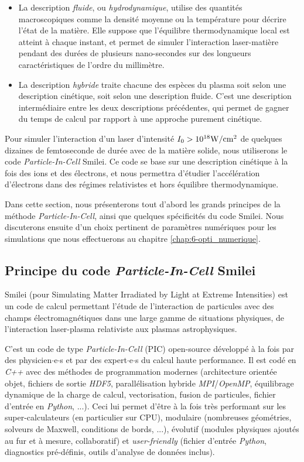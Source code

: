 \begin{refsection}
\begin{itemize}
    \item La description \textit{fluide}, ou \textit{hydrodynamique}, utilise des quantités macroscopiques comme la densité moyenne ou la température pour décrire l'état de la matière. Elle suppose que l'équilibre thermodynamique local est atteint à chaque instant, et permet de simuler l'interaction laser-matière pendant des durées de plusieurs nano-secondes sur des longueurs caractéristiques de l'ordre du millimètre.
    
    \item La description \textit{hybride} traite chacune des espèces du plasma soit selon une description cinétique, soit selon une description fluide. C'est une description intermédiaire entre les deux descriptions précédentes, qui permet de gagner du temps de calcul par rapport à une approche purement cinétique.
\end{itemize}

Pour simuler l'interaction d'un laser d'intensité $I_0>10^{18} \rm W/cm^2$ de quelques dizaines de femtoseconde de durée avec de la matière solide, nous utiliserons le code \textit{Particle-In-Cell} Smilei. Ce code se base sur une description cinétique à la fois des ions et des électrons, et nous permettra d'étudier l'accélération d'électrons dans des régimes relativistes et hors équilibre thermodynamique.

Dans cette section, nous présenterons tout d'abord les grands principes de la méthode \textit{Particle-In-Cell}, ainsi que quelques spécificités du code Smilei. Nous discuterons ensuite d'un choix pertinent de paramètres numériques pour les simulations que nous effectuerons au chapitre \ref{chap:6-opti_numerique}.

\subsection{Principe du code \textit{Particle-In-Cell} Smilei}

Smilei (pour Simulating Matter Irradiated by Light at Extreme Intensities) est un code de calcul permettant l'étude de l'interaction de particules avec des champs électromagnétiques dans une large gamme de situations physiques, de l’interaction laser-plasma relativiste aux plasmas astrophysiques. 


C'est un code de type \textit{Particle-In-Cell} (PIC) open-source développé à la fois par des physicien$\cdot$e$\cdot$s et par des expert$\cdot$e$\cdot$s du calcul haute performance. Il est codé en \textit{C++} avec des méthodes de programmation modernes (architecture orientée objet, fichiers de sortie \textit{HDF5}, parallélisation hybride \textit{MPI}/\textit{OpenMP}, équilibrage dynamique de la charge de calcul, vectorisation, fusion de particules, fichier d'entrée en \textit{Python}, ...). Ceci lui permet d'être à la fois très performant sur les super-calculateurs (en particulier sur CPU), modulaire (nombreuses géométries, solveurs de Maxwell, conditions de bords, ...), évolutif (modules physiques ajoutés au fur et à mesure, collaboratif) et \textit{user-friendly} (fichier d'entrée \textit{Python}, diagnostics pré-définis, outils d'analyse de données inclus).



\end{refsection}

